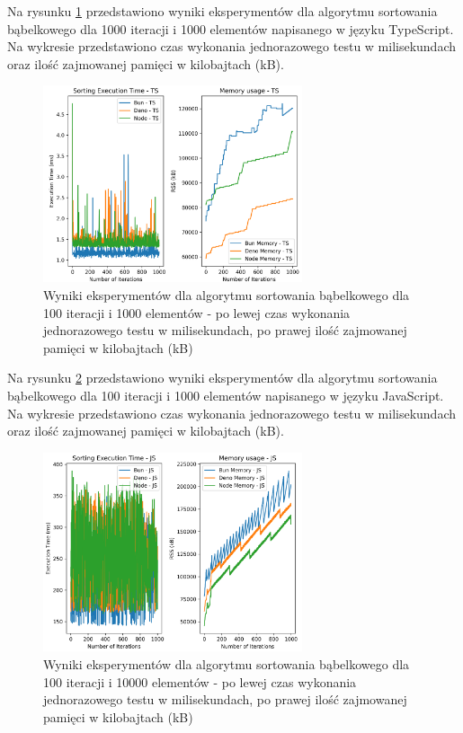 Na rysunku \ref{fig:bubble_sorting_e3_ts} przedstawiono wyniki eksperymentów dla algorytmu sortowania bąbelkowego dla 1000 iteracji i 1000 elementów napisanego w języku TypeScript. Na wykresie przedstawiono czas wykonania jednorazowego testu w milisekundach oraz ilość zajmowanej pamięci w kilobajtach (kB).

\begin{figure}[H]
  \centering
  \includegraphics[width=0.68\textwidth]{Figures/sorting/sorting_bubble_1000_1000_ts.png}
  \caption{Wyniki eksperymentów dla algorytmu sortowania bąbelkowego dla 100 iteracji i 1000 elementów - po lewej czas wykonania jednorazowego testu w milisekundach, po prawej ilość zajmowanej pamięci w kilobajtach (kB)}
  \label{fig:bubble_sorting_e3_ts}
\end{figure}

Na rysunku \ref{fig:bubble_sorting_e4} przedstawiono wyniki eksperymentów dla algorytmu sortowania bąbelkowego dla 100 iteracji i 1000 elementów napisanego w języku JavaScript. Na wykresie przedstawiono czas wykonania jednorazowego testu w milisekundach oraz ilość zajmowanej pamięci w kilobajtach (kB).

\begin{figure}[H]
  \centering
  \includegraphics[width=0.68\textwidth]{Figures/sorting/sorting_bubble_1000_10000_js.png}
  \caption{Wyniki eksperymentów dla algorytmu sortowania bąbelkowego dla 100 iteracji i 10000 elementów - po lewej czas wykonania jednorazowego testu w milisekundach, po prawej ilość zajmowanej pamięci w kilobajtach (kB)}
  \label{fig:bubble_sorting_e4}
\end{figure}

